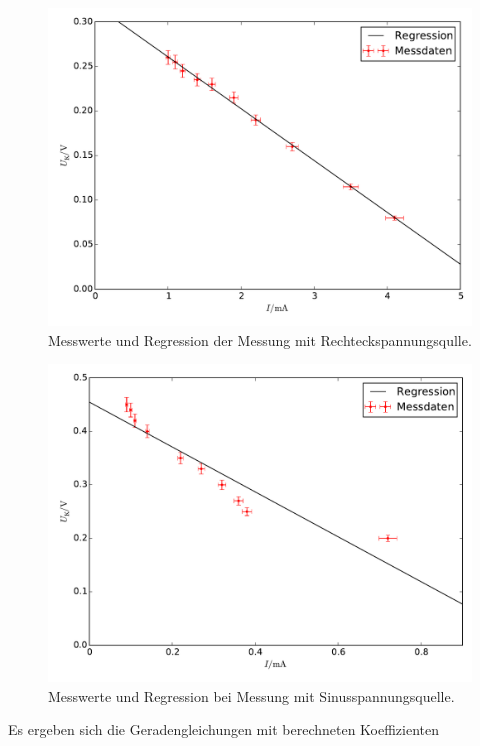\begin{figure}[h]
	\centering
	\label{fig:Recht}
	\includegraphics[width=\textwidth]{content/plot_Recht.pdf}
	\caption{Messwerte und Regression der Messung mit Rechteckspannungsqulle.}
\end{figure}
\begin{figure}[h]
	\centering
	\label{fig:Sin}
	\includegraphics[width=\textwidth]{content/plot_Sin.pdf}
	\caption{Messwerte und Regression bei Messung mit Sinusspannungsquelle.}
\end{figure}

Es ergeben sich die Geradengleichungen mit berechneten Koeffizienten


